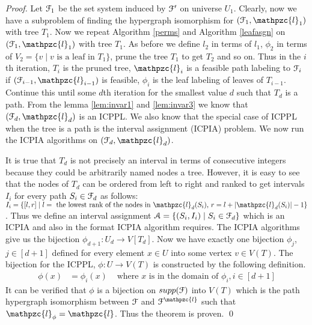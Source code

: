 \documentclass[a4paper,UKenglish,numberwithinsect]{lipics} %
\def\cA{{\cal A}}
\def\cB{{\cal B}}
\def\cF{{\cal F}}
\def\cL{{\cal L}}
\def\cl{\mathpzc{l}}
\begin{document}
\begin{proof}
\noindent
Let $\cF_1$ be the set system induced by $\cF'$ on universe $U_1$.
Clearly, now we have a subproblem of finding the
hypergraph isomorphism for $(\cF_1, \cl_1)$ with tree $T_1$.
\noindent
Now we repeat Algorithm \ref{perms} and Algorithm \ref{leafasgn} on
$(\cF_1, \cl_1)$ with tree $T_1$. As before we define $l_2$ in terms
of $l_1$, $\phi_2$ in terms of $V_2 = \{v \mid v \text{ is a leaf in }
T_1\}$, prune the tree $T_1$ to get $T_2$ and so on.  Thus in the
$i$th iteration, $T_i$ is the pruned tree, $\cl_i$ is a feasible path
labeling to $\cF_i$ if $(\cF_{i-1}, \cl_{i-1})$ is feasible, $\phi_i$
is the leaf labeling of leaves of $T_{i-1}$. Continue this until some
$d$th iteration for the smallest value $d$ such that $T_d$ is a
path. From the lemma \ref{lem:invar1} and \ref{lem:invar3} we know
that $(\cF_d, \cl_d)$ is an ICPPL. We also know that the special case
of ICPPL when the tree is a path is the interval assignment (ICPIA)
problem.  We now run the ICPIA algorithms \cite{nsnrs09} on $(\cF_d,
\cl_d)$.

\noindent
It is true that $T_d$ is not precisely an interval in terms of
consecutive integers because they could be arbitrarily named nodes a
tree. However, it is easy to see that the nodes of $T_{d}$ can be
ordered from left to right and ranked to get intervals $I_i$ for every
path $S_i \in \cF_d$ as follows: $I_i = \{[l,r] \mid l = \text{ the
  lowest rank of the nodes in }\cl_d(S_i) \text{, } r =
l+|\cl_d(S_i)|-1 \}$. Thus we define an interval assignment $\cA = \{
(S_i, I_i) \mid S_i \in \cF_d\}$ which is an ICPIA and also in the
format ICPIA algorithm requires. The ICPIA algorithms give us the
bijection $\phi_{d+1} : U_d \rightarrow V[T_d]$. Now we have exactly
one bijection $\phi_j$, $j \in [d+1]$ defined for every element $x
\in U$ into some vertex $v \in V(T)$. The bijection for the ICPPL, $\phi: U
\rightarrow V(T)$ is constructed by the following definition.
\begin{align*}
  \phi(x) &= \phi_i(x)& \text{ where $x$ is in the domain of } \phi_i,
  i \in [d+1]
\end{align*}
It can be verified that $\phi$ is a bijection on $supp(\cF)$ into
$V(T)$ which is the path hypergraph isomorphism between $\cF$ and
$\cF^\cl$ such that $\cl_\phi = \cl$. Thus the theorem is proven.
\qed
\end{proof}
\end{document}
